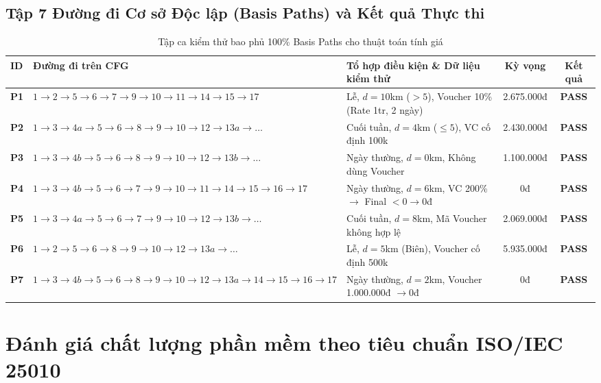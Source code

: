 \documentclass[12pt,a4paper,oneside]{report}
\begin{document}
\section{Tập 7 Đường đi Cơ sở Độc lập (Basis Paths) và Kết quả Thực thi}
\begin{table}[ht]
  \centering\footnotesize
  \begin{tabularx}{\textwidth}{p{0.8cm}p{4.2cm}Xcc}
    \toprule
    \textbf{ID} & \textbf{Đường đi trên CFG} & \textbf{Tổ hợp điều kiện \& Dữ liệu kiểm thử} & \textbf{Kỳ vọng} & \textbf{Kết quả} \\
    \midrule
    \textbf{P1} & $1 \to 2 \to 5 \to 6 \to 7 \to 9 \to 10 \to 11 \to 14 \to 15 \to 17$ & Lễ, $d=10$km ($>5$), Voucher 10\% (Rate 1tr, 2 ngày) & 2.675.000đ & \textbf{PASS} \\
    \textbf{P2} & $1 \to 3 \to 4a \to 5 \to 6 \to 8 \to 9 \to 10 \to 12 \to 13a \to \dots$ & Cuối tuần, $d=4$km ($\le 5$), VC cố định 100k & 2.430.000đ & \textbf{PASS} \\
    \textbf{P3} & $1 \to 3 \to 4b \to 5 \to 6 \to 8 \to 9 \to 10 \to 12 \to 13b \to \dots$ & Ngày thường, $d=0$km, Không dùng Voucher & 1.100.000đ & \textbf{PASS} \\
    \textbf{P4} & $1 \to 3 \to 4b \to 5 \to 6 \to 7 \to 9 \to 10 \to 11 \to 14 \to 15 \to 16 \to 17$ & Ngày thường, $d=6$km, VC 200\% $\to$ Final $<0 \to 0$đ & 0đ & \textbf{PASS} \\
    \textbf{P5} & $1 \to 3 \to 4a \to 5 \to 6 \to 7 \to 9 \to 10 \to 12 \to 13b \to \dots$ & Cuối tuần, $d=8$km, Mã Voucher không hợp lệ & 2.069.000đ & \textbf{PASS} \\
    \textbf{P6} & $1 \to 2 \to 5 \to 6 \to 8 \to 9 \to 10 \to 12 \to 13a \to \dots$ & Lễ, $d=5$km (Biên), Voucher cố định 500k & 5.935.000đ & \textbf{PASS} \\
    \textbf{P7} & $1 \to 3 \to 4b \to 5 \to 6 \to 8 \to 9 \to 10 \to 12 \to 13a \to 14 \to 15 \to 16 \to 17$ & Ngày thường, $d=2$km, Voucher 1.000.000đ $\to 0$đ & 0đ & \textbf{PASS} \\
    \bottomrule
  \end{tabularx}
  \caption{Tập ca kiểm thử bao phủ 100\% Basis Paths cho thuật toán tính giá}
  \label{tab:basis_paths}
\end{table}

\chapter{Đánh giá chất lượng phần mềm theo tiêu chuẩn ISO/IEC 25010}
\end{document}
